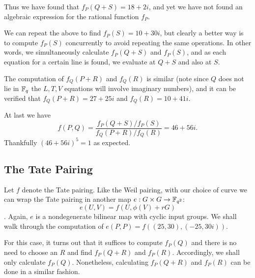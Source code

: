 Thus we have found that $f_P(Q+S) = 18+2i$, and yet we have not found
an algebraic expression for the rational function $f_P$.

We can repeat the above to find $f_P(S) = 10 + 30i$, but clearly a better way
is to compute $f_P(S)$ concurrently to avoid repeating the same operations.
In other words, we simultaneously calculate $f_P(Q+S)$ and $f_P(S)$, and
as each equation for a certain line is found,
we evaluate at $Q+S$ and also at $S$.

The computation of $f_Q(P+R)$ and $f_Q(R)$ is similar (note since
$Q$ does not lie in $\mathbb{F}_q$ the $L,T,V$ equations will involve imaginary
numbers), and it can be verified that
$f_Q(P+R) = 27+25i$ and $f_Q(R)=10+41i$.

At last we have
\[
f(P,Q) = \frac{f_P(Q+S)/f_P(S)}{f_Q(P+R)/f_Q(R)} = 46+56i .
\] Thankfully $(46+56i)^5 = 1$ as expected.

\subsection {The Tate Pairing}

Let $f$ denote the Tate pairing.
Like the Weil pairing, with our choice of curve we can wrap the Tate pairing
in another map
$e : G\times G \rightarrow \mathbb{F}_{q^2}$:
\[ e(U, V) = f(U, \phi(V) + rG) \].
Again, $e$ is a nondegenerate bilinear map with cyclic input groups.
We shall walk through the computation of $e(P, P) = f((25,30), (-25,30i))$.

For this case, it turns out that it suffices to compute
$f_P(Q)$ and there is no need to choose an $R$ and 
find $f_P(Q+R)$ and $f_P(R)$. Accordingly,
we shall only calculate $f_P(Q)$.
Nonetheless, calculating $f_P(Q+R)$ and $f_P(R)$ can be done in
a similar fashion.

